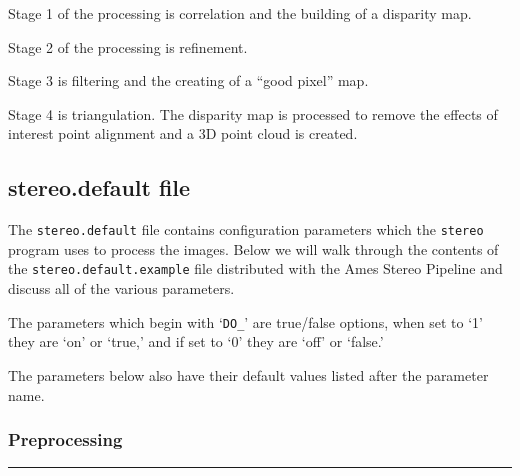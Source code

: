 Stage 1 of the processing is correlation and the building of a disparity map. 

Stage 2 of the processing is refinement. 

Stage 3 is filtering and the creating of a ``good pixel'' map. 

Stage 4 is triangulation. The disparity map is processed to remove
the effects of interest point alignment and a 3D point cloud is
created.


\subsection{stereo.default file}
\label{stereo.default}

The \texttt{stereo.default} file contains configuration parameters
which the \texttt{stereo} program uses to process the images.  Below
we will walk through the contents of the \texttt{stereo.default.example}
file distributed with the Ames Stereo Pipeline and discuss all of
the various parameters.

The parameters which begin with `\texttt{DO\_}' are true/false options,
when set to `1' they are `on' or `true,' and if set to `0' they are
`off' or `false.'

The parameters below also have their default values listed after
the parameter name.

\subsubsection*{Preprocessing}
\hrule
\bigskip

